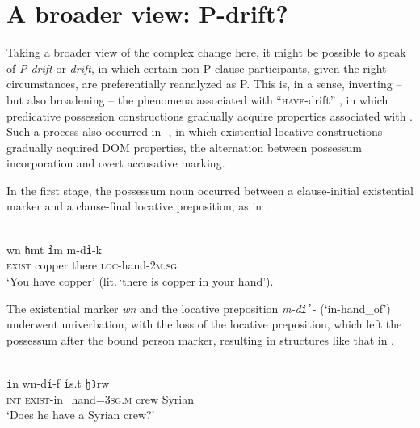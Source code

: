 \documentclass[output=paper]{LSP/langsci}
\begin{document}
\section{A broader view: P-drift?}\label{05-sec:6}

Taking a broader view of the complex change here, it might be possible to speak of \textit{P-drift} or \textit{ drift}, in which certain non-P clause participants, given the right circumstances, are preferentially reanalyzed as P. This is, in a sense, inverting – but also broadening – the phenomena associated with “\textsc{have}-drift” \citep{Comrie1981Language,Stassen2009Predicative}, in which  predicative possession constructions gradually acquire properties associated with . Such a process also occurred in -, in which existential-locative constructions gradually acquired DOM properties, \ie the alternation between possessum incorporation and overt accusative marking. 

 In the first stage, the possessum noun occurred between a clause-initial existential marker and a clause-final locative preposition, as in .

\begin{exe}
\ex%
\label{05-gr-ex:53}
\\
\gll wn \texttt{ḥ}mt \texttt{ỉ}m m-d\texttt{ỉ}-k\\
\textsc{exist} copper there \textsc{loc-}hand\textsc{-2m.sg}\\
\glt ‘You have copper’ (lit.\,‘there is copper in your hand’).  %
\end{exe}

The existential marker \textit{wn} and the locative preposition \textit{m-d\texttt{ỉ}}- (‘in-hand\_of’) underwent univerbation, with the loss of the locative preposition, which left the possessum after the bound person marker, resulting in structures like that in .

\begin{exe}
\ex%
\label{05-gr-ex:54}
\\ %
\gll \texttt{ỉ}n wn-d\texttt{ỉ}-f \texttt{ỉ}s.t \texttt{ḫꜢ}rw\\
\textsc{int} \textsc{exist}-in\_hand=\textsc{3sg.m} crew Syrian\\
\glt ‘Does he have a Syrian crew?’
\end{exe}
\end{document}
